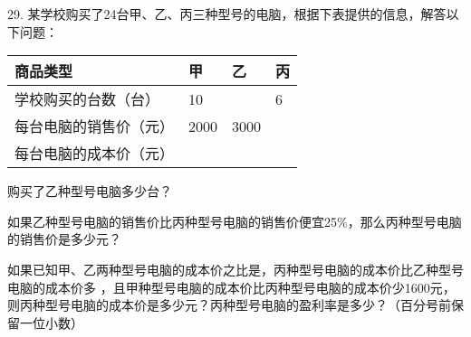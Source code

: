 29. 某学校购买了24台甲、乙、丙三种型号的电脑，根据下表提供的信息，解答以下问题：\\

\begin{center}

    \begin{tabular}{|p{4cm}<{\centering}|p{2cm}<{\centering}|p{2cm}<{\centering}|p{2cm}<{\centering}|}

         \hline

         商品类型&甲&乙&丙 \\

         \hline

        学校购买的台数（台）&10&&6 \\

        \hline

        每台电脑的销售价（元）&2000&3000& \\

        \hline

        每台电脑的成本价（元）&&&\\

        \hline

    \end{tabular}

\end{center}



\begin{subquestions}

    \subquestion 购买了乙种型号电脑多少台？

    \subquestion 如果乙种型号电脑的销售价比丙种型号电脑的销售价便宜25$\%$，那么丙种型号电脑的销售价是多少元？

    \subquestion 如果已知甲、乙两种型号电脑的成本价之比是，丙种型号电脑的成本价比乙种型号电脑的成本价多 ，且甲种型号电脑的成本价比丙种型号电脑的成本价少1600元，则丙种型号电脑的成本价是多少元？丙种型号电脑的盈利率是多少？（百分号前保留一位小数）

\end{subquestions}



